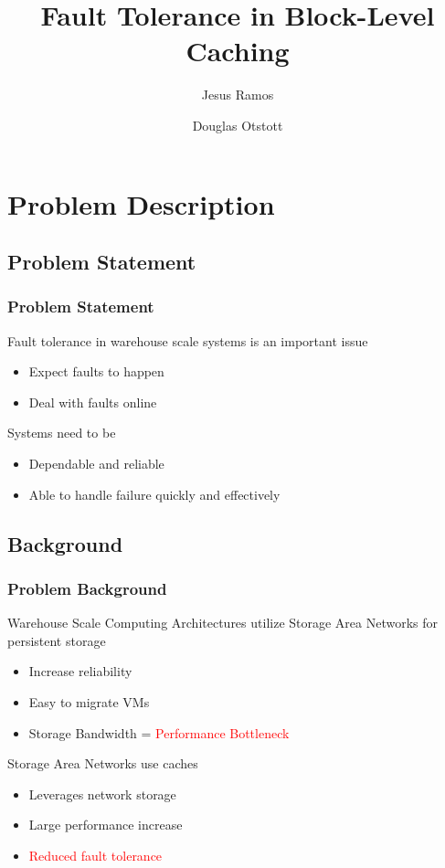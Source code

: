 \documentclass{beamer}
\title{Fault Tolerance in Block-Level Caching}
\author{
  Jesus Ramos \and
  Douglas Otstott
}
\institute[FIU]{Florida International University}
\date{}
\begin{document}
\maketitle

\section{Problem Description}

\subsection{Problem Statement}

\begin{frame}
  \frametitle{Problem Statement}

  Fault tolerance in warehouse scale systems is an important issue
  \begin{itemize}
    \item Expect faults to happen
    \item Deal with faults online
  \end{itemize}

  Systems need to be
  \begin{itemize}
    \item Dependable and reliable
    \item Able to handle failure quickly and effectively
  \end{itemize}

\end{frame}


\subsection{Background}

\begin{frame}
  \frametitle{Problem Background}

  Warehouse Scale Computing Architectures utilize Storage Area
  Networks for persistent storage
  \begin{itemize}
    \item Increase reliability
    \item Easy to migrate VMs
    \item Storage Bandwidth  = \textcolor{red}{Performance Bottleneck}
  \end{itemize}

  Storage Area Networks use caches
  \begin{itemize}
    \item Leverages network storage
    \item Large performance increase
    \item \textcolor{red}{Reduced fault tolerance}
  \end{itemize}

\end{frame}
\end{document}
